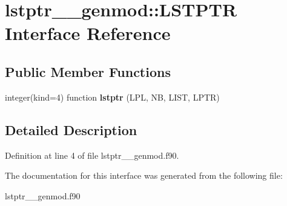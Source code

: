 \hypertarget{interfacelstptr____genmod_1_1_l_s_t_p_t_r}{\section{lstptr\+\_\+\+\_\+genmod\+:\+:L\+S\+T\+P\+T\+R Interface Reference}
\label{interfacelstptr____genmod_1_1_l_s_t_p_t_r}
}
\subsection*{Public Member Functions}
\begin{DoxyCompactItemize}
\item 
\hypertarget{interfacelstptr____genmod_1_1_l_s_t_p_t_r_a3a10bae26a91c90aee13cb39c18d07b2}{integer(kind=4) function {\bfseries lstptr} (L\+P\+L, N\+B, L\+I\+S\+T, L\+P\+T\+R)}\label{interfacelstptr____genmod_1_1_l_s_t_p_t_r_a3a10bae26a91c90aee13cb39c18d07b2}

\end{DoxyCompactItemize}


\subsection{Detailed Description}


Definition at line 4 of file lstptr\+\_\+\+\_\+genmod.\+f90.



The documentation for this interface was generated from the following file\+:\begin{DoxyCompactItemize}
\item 
lstptr\+\_\+\+\_\+genmod.\+f90\end{DoxyCompactItemize}
